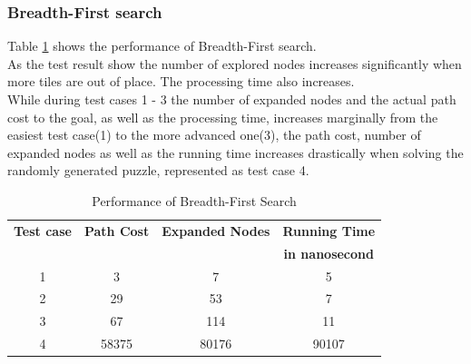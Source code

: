 \documentclass[journal]{IEEEtran}
\begin{document}
\subsubsection{Breadth-First search}
Table \ref{tab:bfs} shows the performance of Breadth-First search.\\
As the test result show the number of explored nodes increases significantly when more tiles are out of place. The processing time also increases.\\
While during test cases 1 - 3 the number of expanded nodes and the actual path cost to the goal, as well as the processing time, increases marginally from the easiest test case(1) to the more advanced one(3), the path cost, number of expanded nodes as well as the running time increases drastically when solving the randomly generated puzzle, represented as test case 4. \\ 
\begin{table}[h]
\renewcommand{\arraystretch}{1.3}
\centering
\caption{Performance of Breadth-First Search}
\begin{tabular}{|c|c|c|c|}
\hline
\bfseries Test case &\bfseries Path Cost & \bfseries Expanded Nodes & \bfseries Running Time \\
 & & &  \bfseries in nanosecond\\\hline
1 & 3 & 7 & 5 \\
2 & 29 & 53 & 7\\
3 & 67 & 114 & 11 \\
4 & 58375 & 80176 & 90107\\\hline
\end{tabular}
\label{tab:bfs}
\end{table}
\end{document}
